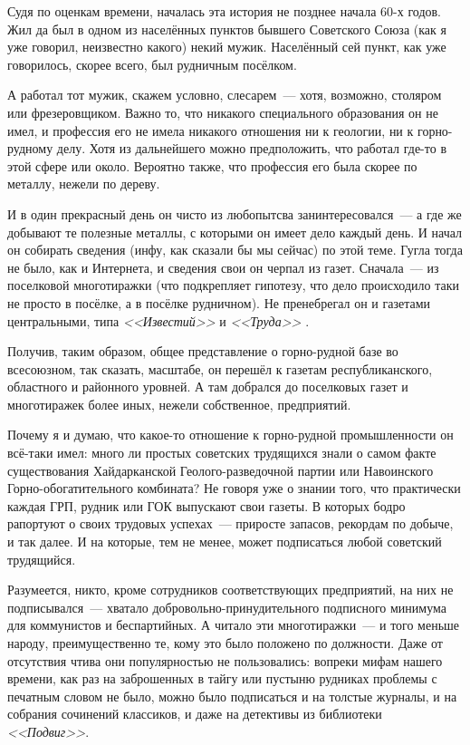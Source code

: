 Судя по оценкам времени, началась эта история не позднее начала 60-х годов. Жил да был в одном из населённых пунктов бывшего Советского Союза (как я уже говорил, неизвестно какого) некий мужик. Населённый сей пункт, как уже говорилось, скорее всего, был рудничным посёлком.

А работал тот мужик, скажем условно, слесарем~--- хотя, возможно, столяром или фрезеровщиком. Важно то, что никакого специального образования он не имел, и профессия его не имела никакого отношения ни к геологии, ни к горно-рудному делу. Хотя из дальнейшего можно предположить, что работал где-то в этой сфере или около. Вероятно также, что профессия его была скорее по металлу, нежели по дереву.

И в один прекрасный день он чисто из любопытсва занинтересовался~--- а где же добывают те полезные металлы, с которыми он имеет дело каждый день. И начал он собирать сведения (инфу, как сказали бы мы сейчас) по этой теме. Гугла тогда не было, как и Интернета, и сведения свои он черпал из газет. Сначала~--- из поселковой многотиражки (что подкрепляет гипотезу, что дело происходило таки не просто в посёлке, а в посёлке рудничном). Не пренебрегал он и газетами центральными, типа \textit{<<Известий>>} и \textit{<<Труда>>}
.

Получив, таким образом, общее представление о горно-рудной базе во всесоюзном, так сказать, масштабе, он перешёл к газетам республиканского, областного и районного уровней. А там добрался до поселковых газет и многотиражек более иных, нежели собственное, предприятий.

Почему я и думаю, что какое-то отношение к горно-рудной промышленности он всё-таки имел: много ли простых советских трудящихся знали о самом факте существования Хайдарканской Геолого-разведочной партии или Навоинского Горно-обогатительного комбината? Не говоря уже о знании того, что практически каждая ГРП, рудник или ГОК выпускают свои газеты. В которых бодро рапортуют о своих трудовых успехах~--- приросте запасов, рекордам по добыче, и так далее. И на которые, тем не менее, может подписаться любой советский трудящийся.

Разумеется, никто, кроме сотрудников соответствующих предприятий, на них не подписывался~--- хватало добровольно-принудительного подписного минимума для коммунистов и беспартийных. А читало эти многотиражки~--- и того меньше народу, преимущественно те, кому это было положено по должности. Даже от отсутствия чтива они популярностью не пользовались: вопреки мифам нашего времени, как раз на заброшенных в тайгу или пустыню рудниках проблемы с печатным словом не было, можно было подписаться и на толстые журналы, и на собрания сочинений классиков, и даже на детективы из библиотеки \textit{<<Подвиг>>}.

